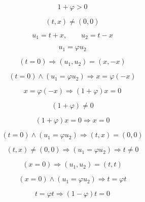 \documentclass[12pt]{article}
\begin{document}
\begin{equation}
1+\varphi>0
\end{equation}

\begin{equation}
(t,x)\neq(0,0)
\end{equation}

\begin{equation}
u_1=t+x,\qquad u_2=t-x
\end{equation}

\begin{equation}
u_1=\varphi u_2
\end{equation}

\begin{equation}
(t=0)\Longrightarrow (u_1,u_2)=(x,-x)
\end{equation}

\begin{equation}
(t=0)\wedge(u_1=\varphi u_2)\Longrightarrow x=\varphi(-x)
\end{equation}

\begin{equation}
x=\varphi(-x)\Longrightarrow (1+\varphi)x=0
\end{equation}

\begin{equation}
(1+\varphi)\neq 0
\end{equation}

\begin{equation}
(1+\varphi)x=0\Longrightarrow x=0
\end{equation}

\begin{equation}
(t=0)\wedge(u_1=\varphi u_2)\Longrightarrow (t,x)=(0,0)
\end{equation}

\begin{equation}
(t,x)\neq(0,0)\Longrightarrow (u_1=\varphi u_2)\Longrightarrow t\neq 0
\end{equation}

\begin{equation}
(x=0)\Longrightarrow (u_1,u_2)=(t,t)
\end{equation}

\begin{equation}
(x=0)\wedge(u_1=\varphi u_2)\Longrightarrow t=\varphi t
\end{equation}

\begin{equation}
t=\varphi t\Longrightarrow (1-\varphi)t=0
\end{equation}
\end{document}
